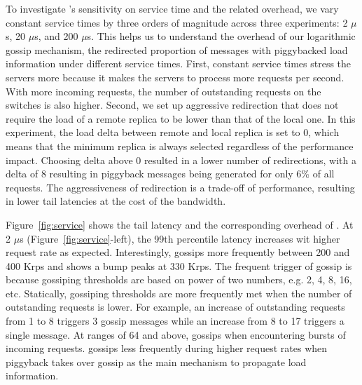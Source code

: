 
To investigate \daronpon's sensitivity on service time and the related overhead, 
we vary constant service times by three orders of magnitude across three experiments: 2 $\mu$s, 20 $\mu$s, and 200 $\mu$s.  
%
This helps us to understand the overhead of our logarithmic gossip mechanism, the redirected proportion of messages with piggybacked load information under different service times. 
%
First, constant service times stress the servers more because it makes the servers
to process more requests per second.  
%
With more incoming requests, the number of outstanding requests 
on the switches is also higher.
%
Second, we set up aggressive redirection that does not require the load of a remote replica to be lower than that of the local one.
%
In this experiment, the load delta between remote and local replica is set to 0, which means that the minimum replica is always selected regardless of the performance impact.
%
Choosing delta above 0 resulted in a lower number of redirections, with a delta of 8 resulting in piggyback messages being generated for only 6\% of all requests.
%
The aggressiveness of redirection is a trade-off of performance, resulting in lower tail latencies at the cost of the bandwidth.

Figure~\ref{fig:service} shows the tail latency and the corresponding overhead 
of \daronpon.
%
%
At 2 $\mu$s (Figure~\ref{fig:service}-left), the 99th percentile latency increases wit higher request rate as expected.   
%
Interestingly, \daronpon gossips more frequently between 200 and 400 Krps and shows a bump peaks at 330 Krps.  
%
The frequent trigger of gossip is because gossiping thresholds are based on power of two numbers, e.g. 2, 4, 8, 16, etc.    
%
Statically, gossiping thresholds are more frequently met when the number of outstanding requests is lower.
%
For example, an increase of outstanding requests from 1 to 8 triggers 3 gossip messages while an increase from 8 to 17 triggers a single message.
%
At ranges of 64 and above, \daronpon gossips when encountering bursts of incoming requests.
%
\daronpon gossips less frequently during higher request rates when piggyback takes over gossip as the main mechanism to propagate load information.

